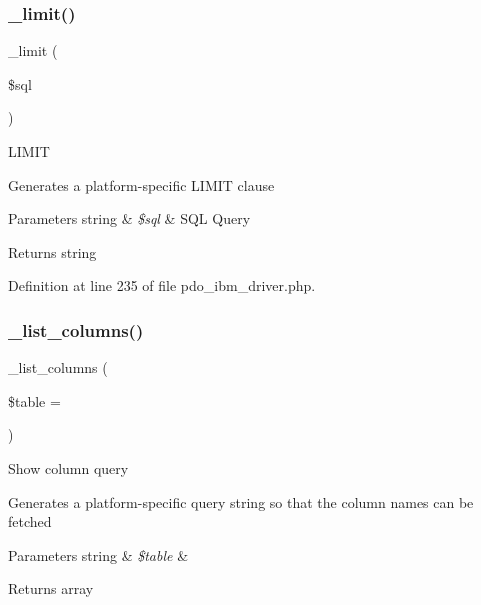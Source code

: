 \subsubsection{\texorpdfstring{\_limit()}{\_limit()}}
{\footnotesize\ttfamily \+\_\+limit (\begin{DoxyParamCaption}\item[{}]{\$sql }\end{DoxyParamCaption})\hspace{0.3cm}{\ttfamily [protected]}}

L\+I\+M\+IT

Generates a platform-\/specific L\+I\+M\+IT clause


\begin{DoxyParams}[1]{Parameters}
string & {\em \$sql} & S\+QL Query \\
\hline
\end{DoxyParams}
\begin{DoxyReturn}{Returns}
string 
\end{DoxyReturn}


Definition at line 235 of file pdo\+\_\+ibm\+\_\+driver.\+php.

\mbox{\label{class_c_i___d_b__pdo__ibm__driver_a7ccb7f9c301fe7f0a9db701254142b63}} 
\subsubsection{\texorpdfstring{\_list\_columns()}{\_list\_columns()}}
{\footnotesize\ttfamily \+\_\+list\+\_\+columns (\begin{DoxyParamCaption}\item[{}]{\$table = {\ttfamily \textquotesingle{}\textquotesingle{}} }\end{DoxyParamCaption})\hspace{0.3cm}{\ttfamily [protected]}}

Show column query

Generates a platform-\/specific query string so that the column names can be fetched


\begin{DoxyParams}[1]{Parameters}
string & {\em \$table} & \\
\hline
\end{DoxyParams}
\begin{DoxyReturn}{Returns}
array 
\end{DoxyReturn}


